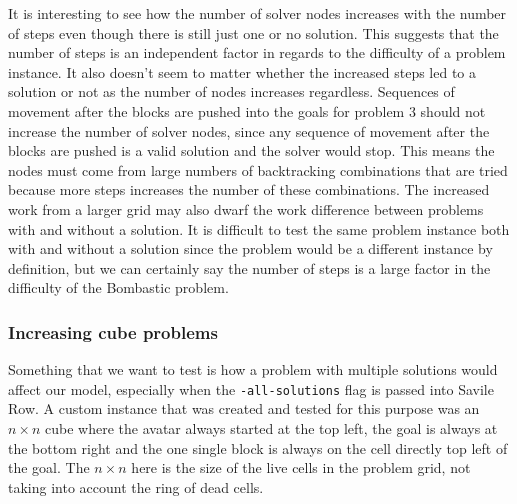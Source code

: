 \documentclass{article}
\begin{document}
It is interesting to see how the number of solver nodes increases with the number of steps even though there is still just one or no solution. This suggests that the number of steps is an independent factor in regards to the difficulty of a problem instance. It also doesn't seem to matter whether the increased steps led to a solution or not as the number of nodes increases regardless. Sequences of movement after the blocks are pushed into the goals for problem 3 should not increase the number of solver nodes, since any sequence of movement after the blocks are pushed is a valid solution and the solver would stop. This means the nodes must come from large numbers of backtracking combinations that are tried because more steps increases the number of these combinations. The increased work from a larger grid may also dwarf the work difference between problems with and without a solution. It is difficult to test the same problem instance both with and without a solution since the problem would be a different instance by definition, but we can certainly say the number of steps is a large factor in the difficulty of the Bombastic problem. 


\subsubsection{Increasing cube problems}
Something that we want to test is how a problem with multiple solutions would affect our model, especially when the \texttt{-all-solutions} flag is passed into Savile Row. A custom instance that was created and tested for this purpose was an $n \times n$ cube where the avatar always started at the top left, the goal is always at the bottom right and the one single block is always on the cell directly top left of the goal. The $n \times n$ here is the size of the live cells in the problem grid, not taking into account the ring of dead cells. 
\end{document}
